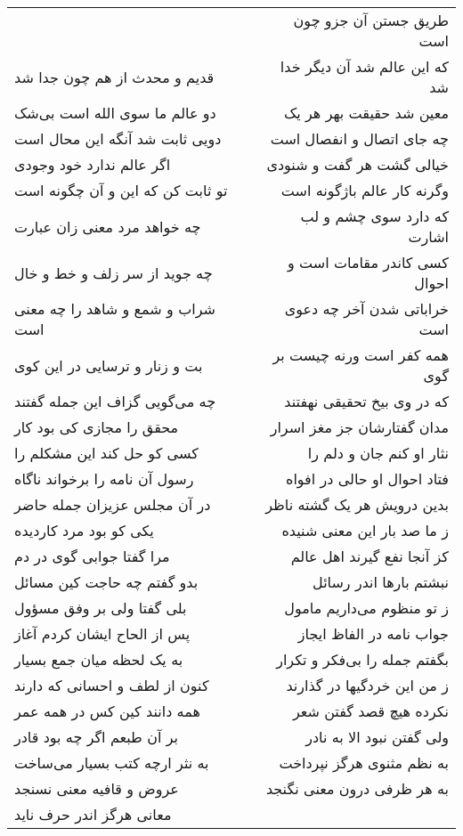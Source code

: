 \begin{center}
\begin{longtable}{l p{0.5cm} r}
&&
طریق جستن آن جزو چون است
\\
قدیم و محدث از هم چون جدا شد
&&
که این عالم شد آن دیگر خدا شد
\\
دو عالم ما سوی الله است بی‌شک
&&
معین شد حقیقت بهر هر یک
\\
دویی ثابت شد آنگه این محال است
&&
چه جای اتصال و انفصال است
\\
اگر عالم ندارد خود وجودی
&&
خیالی گشت هر گفت و شنودی
\\
تو ثابت کن که این و آن چگونه است
&&
وگرنه کار عالم باژگونه است
\\
چه خواهد مرد معنی زان عبارت
&&
که دارد سوی چشم و لب اشارت
\\
چه جوید از سر زلف و خط و خال
&&
کسی کاندر مقامات است و احوال
\\
شراب و شمع و شاهد را چه معنی است
&&
خراباتی شدن آخر چه دعوی است
\\
بت و زنار و ترسایی در این کوی
&&
همه کفر است ورنه چیست بر گوی
\\
چه می‌گویی گزاف این جمله گفتند
&&
که در وی بیخ تحقیقی نهفتند
\\
محقق را مجازی کی بود کار
&&
مدان گفتارشان جز مغز اسرار
\\
کسی کو حل کند این مشکلم را
&&
نثار او کنم جان و دلم را
\\
رسول آن نامه را برخواند ناگاه
&&
فتاد احوال او حالی در افواه
\\
در آن مجلس عزیزان جمله حاضر
&&
بدین درویش هر یک گشته ناظر
\\
یکی کو بود مرد کاردیده
&&
ز ما صد بار این معنی شنیده
\\
مرا گفتا جوابی گوی در دم
&&
کز آنجا نفع گیرند اهل عالم
\\
بدو گفتم چه حاجت کین مسائل
&&
نبشتم بارها اندر رسائل
\\
بلی گفتا ولی بر وفق مسؤول
&&
ز تو منظوم می‌داریم مامول
\\
پس از الحاح ایشان کردم آغاز
&&
جواب نامه در الفاظ ایجاز
\\
به یک لحظه میان جمع بسیار
&&
بگفتم جمله را بی‌فکر و تکرار
\\
کنون از لطف و احسانی که دارند
&&
ز من این خردگیها در گذارند
\\
همه دانند کین کس در همه عمر
&&
نکرده هیچ قصد گفتن شعر
\\
بر آن طبعم اگر چه بود قادر
&&
ولی گفتن نبود الا به نادر
\\
به نثر ارچه کتب بسیار می‌ساخت
&&
به نظم مثنوی هرگز نپرداخت
\\
عروض و قافیه معنی نسنجد
&&
به هر ظرفی درون معنی نگنجد
\\
معانی هرگز اندر حرف ناید

\end{longtable}
\end{center}
